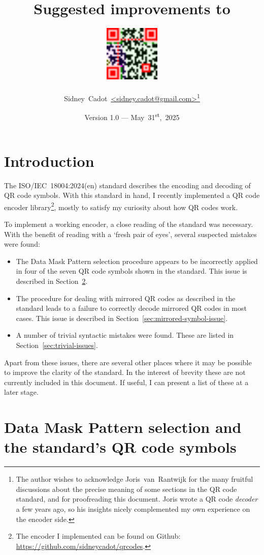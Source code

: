 \documentclass[a4paper,twoside]{article}
\title{Suggested improvements to \standard}
\author{\includegraphics[width=0.2\textwidth]{images/email.png} \\ \\ Sidney~Cadot~\url{<sidney.cadot@gmail.com>}\footnote{The author wishes to acknowledge Joris~van~Rantwijk for the many fruitful discussions about the
precise meaning of some sections in the QR code standard, and for proofreading this document. Joris wrote a QR code \emph{decoder} a few years ago, so his insights nicely complemented my own experience on the encoder side.}}
\date{Version 1.0 --- May~31\textsuperscript{st},~2025}
\newcommand{\shortstandard}{ISO/IEC~18004}
\newcommand{\standard}{\shortstandard:2024(en)}
\begin{document}
%
\maketitle
\tableofcontents
%
\section{Introduction}

The \standard{} standard describes the encoding and decoding of QR code symbols. With this standard in hand,
I recently implemented a QR code encoder library\footnote{The encoder I implemented can be found on Github:
\url{https://github.com/sidneycadot/qrcodes}.}, mostly to satisfy my curiosity about how QR codes work.

To implement a working encoder, a close reading of the standard was necessary. With the benefit of reading
with a `fresh pair of eyes', several suspected mistakes were found:

\begin{itemize}
\item The Data Mask Pattern selection procedure appears to be incorrectly applied in four of the seven
      QR code symbols shown in the standard.
      This issue is described in Section~\ref{sec:data-mask-pattern-selection}.
\item The procedure for dealing with mirrored QR codes as described in the standard leads to a failure
      to correctly decode mirrored QR codes in most cases.
      This issue is described in Section~\ref{sec:mirrored-symbol-issue}.
\item A number of trivial syntactic mistakes were found.
      These are listed in Section~\ref{sec:trivial-issues}.
\end{itemize}

Apart from these issues, there are several other places where it may be possible to improve the clarity
of the standard. In the interest of brevity these are not currently included in this document. If useful,
I can present a list of these at a later stage.


\section{ Data Mask Pattern selection and the standard's QR code symbols}
\label{sec:data-mask-pattern-selection}
\end{document}
